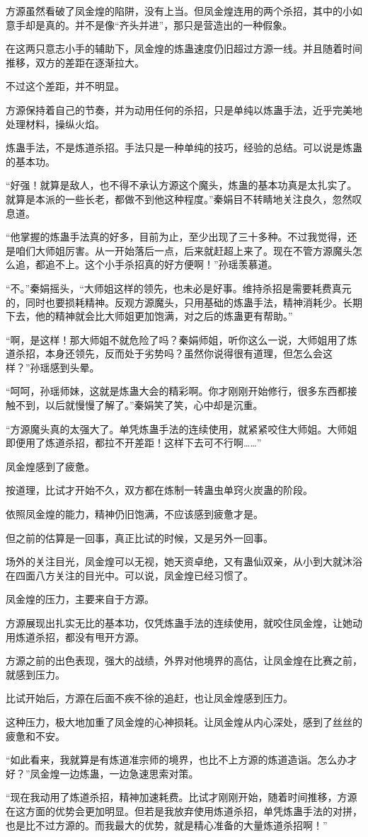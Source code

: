 \begin{this_body}
方源虽然看破了凤金煌的陷阱，没有上当。但凤金煌连用的两个杀招，其中的小如意手却是真的。并不是像“齐头并进”，那只是营造出的一种假象。

在这两只意志小手的辅助下，凤金煌的炼蛊速度仍旧超过方源一线。并且随着时间推移，双方的差距在逐渐拉大。

不过这个差距，并不明显。

方源保持着自己的节奏，并为动用任何的杀招，只是单纯以炼蛊手法，近乎完美地处理材料，操纵火焰。

炼蛊手法，不是炼道杀招。手法只是一种单纯的技巧，经验的总结。可以说是炼蛊的基本功。

“好强！就算是敌人，也不得不承认方源这个魔头，炼蛊的基本功真是太扎实了。就算是本派的一些长老，都做不到他这种程度。”秦娟目不转睛地关注良久，忽然叹息道。

“他掌握的炼蛊手法真的好多，目前为止，至少出现了三十多种。不过我觉得，还是咱们大师姐厉害。从一开始落后一点，后来就赶超上来了。现在不管方源魔头怎么追，都追不上。这个小手杀招真的好方便啊！”孙瑶羡慕道。

“不。”秦娟摇头，“大师姐这样的领先，也未必是好事。维持杀招是需要耗费真元的，同时也要损耗精神。反观方源魔头，只用基础的炼蛊手法，精神消耗少。长期下去，他的精神就会比大师姐更加饱满，对之后的炼蛊更有帮助。”

“啊，是这样！那大师姐不就危险了吗？秦娟师姐，听你这么一说，大师姐用了炼道杀招，本身还领先，反而处于劣势吗？虽然你说得很有道理，但怎么会这样？”孙瑶感到头晕。

“呵呵，孙瑶师妹，这就是炼蛊大会的精彩啊。你才刚刚开始修行，很多东西都接触不到，以后就慢慢了解了。”秦娟笑了笑，心中却是沉重。

“方源魔头真的太强大了。单凭炼蛊手法的连续使用，就紧紧咬住大师姐。大师姐即便用了炼道杀招，都拉不开差距！这样下去可不行啊……”

凤金煌感到了疲惫。

按道理，比试才开始不久，双方都在炼制一转蛊虫单窍火炭蛊的阶段。

依照凤金煌的能力，精神仍旧饱满，不应该感到疲惫才是。

但之前的估算是一回事，真正比试的时候，又是另外一回事。

场外的关注目光，凤金煌可以无视，她天资卓绝，又有蛊仙双亲，从小到大就沐浴在四面八方关注的目光中。可以说，凤金煌已经习惯了。

凤金煌的压力，主要来自于方源。

方源展现出扎实无比的基本功，仅凭炼蛊手法的连续使用，就咬住凤金煌，让她动用炼道杀招，都没有甩开方源。

方源之前的出色表现，强大的战绩，外界对他境界的高估，让凤金煌在比赛之前，就感到压力。

比试开始后，方源在后面不疾不徐的追赶，也让凤金煌感到压力。

这种压力，极大地加重了凤金煌的心神损耗。让凤金煌从内心深处，感到了丝丝的疲惫和不安。

“如此看来，我就算是有炼道准宗师的境界，也比不上方源的炼道造诣。怎么办才好？”凤金煌一边炼蛊，一边急速思索对策。

“现在我动用了炼道杀招，精神加速耗费。比试才刚刚开始，随着时间推移，方源在这方面的优势会更加明显。但若是我放弃使用炼道杀招，单凭炼蛊手法的对拼，也是比不过方源的。而我最大的优势，就是精心准备的大量炼道杀招啊！”

\end{this_body}

